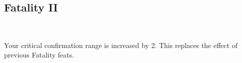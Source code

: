 \subsection*{Fatality II}\label{feat:fatality2}
 \\

Your critical confirmation range is increased by 2. This replaces the effect
of previous Fatality feats.
